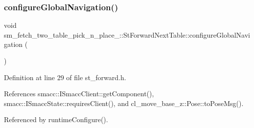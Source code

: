 \subsubsection{\texorpdfstring{configure\+Global\+Navigation()}{configureGlobalNavigation()}}
{\footnotesize\ttfamily void sm\+\_\+fetch\+\_\+two\+\_\+table\+\_\+pick\+\_\+n\+\_\+place\+\_\+::\+St\+Forward\+Next\+Table\+::configure\+Global\+Navigation (\begin{DoxyParamCaption}{ }\end{DoxyParamCaption})\hspace{0.3cm}{\ttfamily [inline]}}



Definition at line 29 of file st\+\_\+forward.\+h.



References smacc\+::\+I\+Smacc\+Client\+::get\+Component(), smacc\+::\+I\+Smacc\+State\+::requires\+Client(), and cl\+\_\+move\+\_\+base\+\_\+z\+::\+Pose\+::to\+Pose\+Msg().



Referenced by runtime\+Configure().


